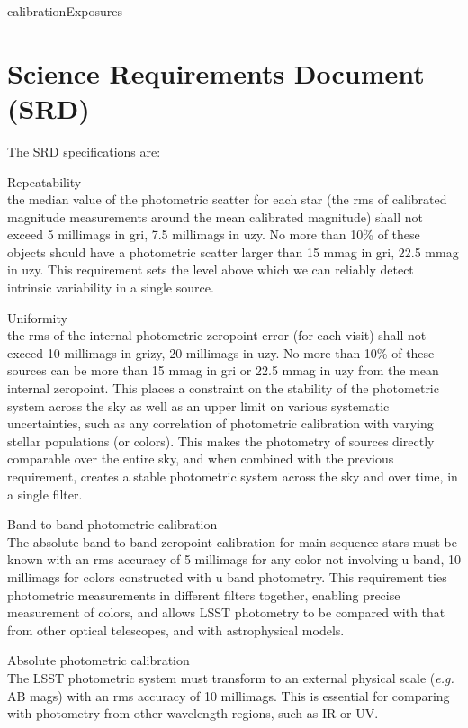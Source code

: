 \documentclass[12pt]{article}
\newcommand{\eg}{\textit{e.g.}\xspace}
\begin{document}
{calibrationExposures}

\section{Science Requirements Document (SRD)}
\label{appSRD}

The SRD specifications are:

\begin{description}
\item{Repeatability}\\
  the median value of the photometric scatter for each star (the rms of calibrated
  magnitude measurements around the mean calibrated magnitude) shall not exceed 5 millimags in gri, 7.5
  millimags in uzy. No more than 10\% of these objects should have a photometric scatter larger than 15 mmag
  in gri, 22.5 mmag in uzy. This requirement sets the level above which we can reliably detect intrinsic
  variability in a single source.
  
\item{Uniformity}\\
  the rms of the internal photometric zeropoint error (for each visit) shall not exceed 10
  millimags in grizy, 20 millimags in uzy. No more than 10\% of these sources can be more than 15 mmag in gri
  or 22.5 mmag in uzy from the mean internal zeropoint. This places a constraint on the stability of the
  photometric system across the sky as well as an upper limit on various systematic uncertainties, such as any
  correlation of photometric calibration with varying stellar populations (or colors). This makes the
  photometry of sources directly comparable over the entire sky, and when combined with the previous
  requirement, creates a stable photometric system across the sky and over time, in a single filter.

\item{Band-to-band photometric calibration}\\
  The absolute band-to-band zeropoint calibration for main sequence
  stars must be known with an rms accuracy of 5 millimags for any color not involving u band, 10 millimags for
  colors constructed with u band photometry. This requirement ties photometric measurements in different
  filters together, enabling precise measurement of colors, and allows LSST photometry to be compared with
  that from other optical telescopes, and with astrophysical models.

\item{Absolute photometric calibration}\\
  The LSST photometric system must transform to an external physical
  scale (\eg AB mags) with an rms accuracy of 10 millimags. This is essential for comparing with photometry
  from other wavelength regions, such as IR or UV.
\end{description}
\end{document}
